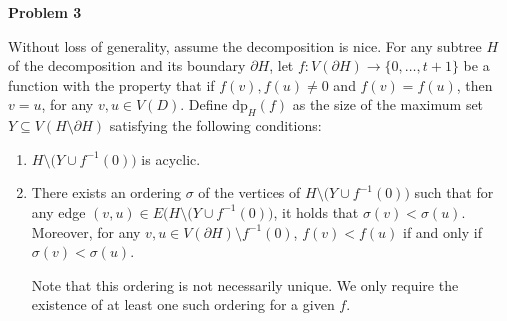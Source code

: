\documentclass[12pt]{article}
\begin{document}
	\bigskip
	
	\textbf{Problem 3}
	
	\medskip
	
	Without loss of generality, assume the decomposition is nice. For any
	subtree \(H\) of the decomposition and its boundary \(\partial H\), let \(f
	: V(\partial H) \to \{0, \ldots, t + 1\}\) be a function with the property
	that if \(f(v), f(u) \neq 0\) and \(f(v) = f(u)\), then \(v = u\), for any
	\(v, u \in V(D)\). Define \(\text{dp}_{H}(f)\) as the size of the maximum
	set \(Y \subseteq V(H \setminus \partial H)\) satisfying the following
	conditions:
	\begin{enumerate}
		\item \(H \setminus \big( Y \cup f^{-1}(0) \big)\) is acyclic.
		
		\item There exists an ordering \(\sigma\) of the vertices of \(H
		      \setminus \big( Y \cup f^{-1}(0) \big)\) such that for any edge
		      \((v, u) \in E(H \setminus \big( Y \cup f^{-1}(0) \big)\), it
		      holds that \(\sigma(v) < \sigma(u)\). Moreover, for any \(v, u \in
		      V(\partial H) \setminus f^{-1}(0)\), \(f(v) < f(u)\) if and only
		      if \(\sigma(v) < \sigma(u)\).
		      
		      Note that this ordering is not necessarily unique. We only require
		      the existence of at least one such ordering for a given \(f\).
	\end{enumerate}
	
	\medskip
	
\end{document}
